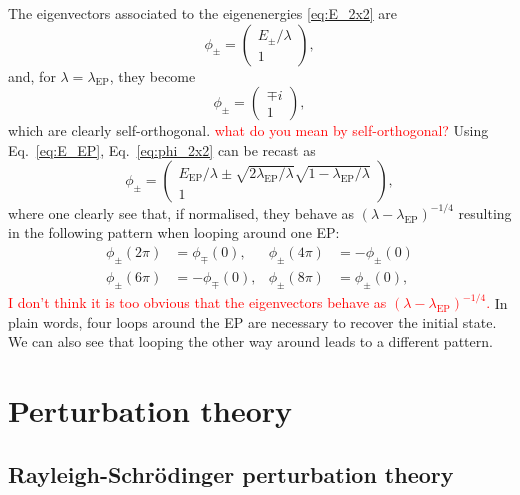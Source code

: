 \documentclass[11pt,a4paper]{article}
\newcommand{\titou}[1]{\textcolor{red}{#1}}
\begin{document}
The eigenvectors associated to the eigenenergies \eqref{eq:E_2x2} are
\begin{equation} \label{eq:phi_2x2}
\phi_{\pm}=
	\begin{pmatrix}
		E_{\pm}/\lambda
		\\ 
		1
	\end{pmatrix},
\end{equation}
and, for $\lambda=\lambda_\text{EP}$, they become
\begin{equation}
\phi_{\pm}=\begin{pmatrix}
\mp i \\ 1
\end{pmatrix},
\end{equation}
which are clearly self-orthogonal. 
\titou{what do you mean by self-orthogonal?}
Using Eq.~\eqref{eq:E_EP}, Eq.~\eqref{eq:phi_2x2} can be recast as
\begin{equation}
\phi_{\pm}=
	\begin{pmatrix}
		E_\text{EP}/\lambda \pm \sqrt{2\lambda_\text{EP}/\lambda} \sqrt{1 - \lambda_\text{EP}/\lambda} 
		\\ 
		1
	\end{pmatrix},
\end{equation}
where one clearly see that, if normalised, they behave as $(\lambda - \lambda_\text{EP})^{-1/4}$ resulting in the following pattern when looping around one EP:
\begin{align}
	\phi_{\pm}(2\pi) & = \phi_{\mp}(0),
	&
	\phi_{\pm}(4\pi) & = -\phi_{\pm}(0) \\
	\phi_{\pm}(6\pi) & = -\phi_{\mp}(0),
	&
	\phi_{\pm}(8\pi) & = \phi_{\pm}(0),
\end{align}
\titou{I don't think it is too obvious that the eigenvectors behave as $(\lambda - \lambda_\text{EP})^{-1/4}$.}
In plain words, four loops around the EP are necessary to recover the initial state. 
We can also see that looping the other way around leads to a different pattern.

\section{Perturbation theory}

\subsection{Rayleigh-Schr\"odinger perturbation theory}
\end{document}
